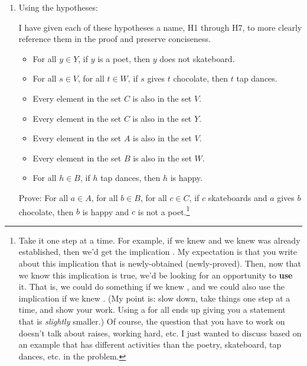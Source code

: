 \documentclass{article}
\begin{document}
\begin{enumerate}
          \newpage

    \item Using the hypotheses:
    
    I have given each of these hypotheses a name, H1 through H7, to more clearly reference them in the proof and preserve conciseness.

          \begin{itemize}
              \item For all $y \in Y$, if $y$ is a poet, then $y$ does not skateboard.
              \item For all $s \in V$, for all $t \in W$, if $s$ gives $t$ chocolate, then $t$ tap
                    dances.
              \item Every element in the set $C$ is also in the set $V$.
              \item Every element in the set $C$ is also in the set $Y$.
              \item Every element in the set $A$ is also in the set $V$.
              \item Every element in the set $B$ is also in the set $W$.
              \item For all $h \in B$, if $h$ tap dances, then $h$ is happy.
          \end{itemize}
          Prove: For all $a \in A$, for all $b \in B$, for all $c \in C$, if $c$ skateboards and $a$ gives $b$ chocolate, then $b$ is happy and $c$ is not a poet.\footnote{Take it one step at a time. For example, if we knew  and we knew  was already established, then we'd get the implication . My expectation is that you write about this implication that is newly-obtained (newly-proved). Then, now that we know this implication is true, we'd be looking for an opportunity to {\bf use} it. That is, we could do something if we knew , and we could also use the implication if we knew . (My point is: slow down, take things one step at a time, and show your work. Using a for all ends up giving you a statement that is \emph{slightly} smaller.) Of course, the question that you have to work on doesn't talk about raises, working hard, etc. I just wanted to discuss based on an example that has different activities than the poetry, skateboard, tap dances, etc. in the problem.}


\end{enumerate}
\end{document}

